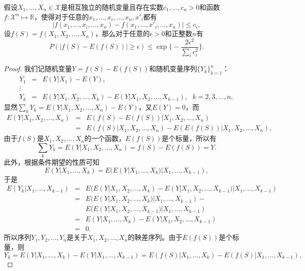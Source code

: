 \begin{theorem}[McDiarmid不等式]
假设$X_1,\ldots, X_n\in \mathcal X$是相互独立的随机变量且存在实数$c_1,\ldots,c_n>0$和函数$f:\mathcal X^n \mapsto \mathbb R$，使得对于任意的$x_1,\ldots,x_i, \ldots, x_n,x'_i$都有
\[
   |f(x_1,\ldots,x_i,\ldots,x_n) - f(x_1,\ldots,x'_i,\ldots,x_n)| \le c_i,
\]
设$f(S)=f(X_1,X_2,\ldots, X_n)$，那么对于任意的$\epsilon>0$和正整数$n$有
\begin{equation}
    P(|f(S) - E(f(S))|\ge \epsilon) \le \exp\big\{-\frac{2\epsilon^2}{\sum\limits_i c_i^2}\big\}.
\end{equation}
\end{theorem}
\begin{proof}
我们记随机变量$Y=f(S)-E(f(S))$和随机变量序列$\{Y_k\}_{k=1}^n$：
\begin{eqnarray}
  \nonumber Y_1 &=& E(Y|X_1) - E(Y), \\
  \nonumber \vdots && \\
  \nonumber Y_k &=& E(Y|X_1, X_2,\ldots,X_k) - E(Y|X_1,X_2,\ldots, X_{k-1}),~~~k=2,3,\ldots,n,
\end{eqnarray}
显然$\sum\limits_k Y_k = E(Y|X_1, X_2,\ldots,X_n) - E(Y)$，又$E(Y)=0$，而
\[
\begin{array}{lcl}
    E(Y|X_1, X_2,\ldots,X_n) &= &E(f(S)-E(f(S))|X_1, X_2,\ldots,X_n)\\
     &=& E(f(S)|X_1, X_2,\ldots,X_n) - E(E(f(S))|X_1, X_2,\ldots,X_n),
\end{array}
\]
由于$f(S)$是$X_1,X_2,\ldots, X_n$的一个函数，$E(f(S))$是个标量，所以有
\[
    \sum\limits_k Y_k = E(Y|X_1, X_2,\ldots,X_n) = f(S) - E(f(S)) = Y.
\]
此外，根据条件期望的性质可知
\[
    E(Y|X_1,\ldots,X_k) = E(E(Y|X_1,\ldots,X_k)|X_1,\ldots,X_{k-1}),
\]
于是
\begin{eqnarray}
  \nonumber E(Y_k|X_1,\ldots,X_{k-1}) &=& E(E(Y|X_1, X_2,\ldots,X_k) - E(Y|X_1,X_2,\ldots, X_{k-1})|X_1,\ldots,X_{k-1}) \\
  \nonumber &=&  E(E(Y|X_1, X_2,\ldots,X_k)|X_1,\ldots,X_{k-1}) - \\
  \nonumber &&   E(E(Y|X_1,X_2,\ldots, X_{k-1})|X_1,\ldots,X_{k-1})\\
  \nonumber &=&  E(Y|X_1,\ldots,X_k) - E(Y|X_1,X_2,\ldots, X_{k-1})\\
  \nonumber &=&  0.
\end{eqnarray}
所以序列$Y_1,Y_2,\ldots, Y_n$是关于$X_1,X_2,\ldots, X_n$的鞅差序列。由于$E(f(S))$是个标量，则
\[
    Y_k = E(Y|X_1,\ldots,X_k) - E(Y|X_1,\ldots,X_{k-1}) = E(f(S)|X_1,\ldots,X_k) - E(f(S)|X_1,\ldots,X_{k-1}),
\]
\end{proof}
